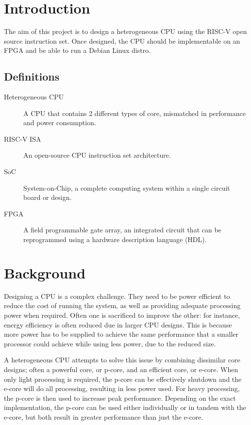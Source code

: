\documentclass[a4paper,fleqn,11pt]{article}
\begin{document}


\pagestyle{plain}

\section{Introduction}
The aim of this project is to design a heterogeneous CPU using the RISC-V open source instruction set. Once designed, the CPU should be implementable on an FPGA and be able to run a Debian Linux distro. 

\subsection{Definitions}
\begin{description}
    \item[Heterogeneous CPU] A CPU that contains 2 different types of core, mismatched in performance and power consumption.
    \item[RISC-V ISA] An open-source CPU instruction set architecture.
    \item[SoC] System-on-Chip, a complete computing system within a single circuit board or design. 
    \item[FPGA] A field programmable gate array, an integrated circuit that can be reprogrammed using a hardware description language (HDL).
\end{description}

\section{Background}
Designing a CPU is a complex challenge. They need to be power efficient to reduce the cost of running the system, as well as providing adequate processing power when required. Often one is sacrificed to improve the other: for instance, energy efficiency is often reduced due in larger CPU designs. This is because more power has to be supplied to achieve the same performance that a smaller processor could achieve while using less power, due to the reduced size.

A heterogeneous CPU attempts to solve this issue by combining dissimilar core designs; often a powerful core, or p-core, and an efficient core, or e-core. When only light processing is required, the p-core can be effectively shutdown and the e-core will do all processing, resulting in less power used. For heavy processing, the p-core is then used to increase peak performance. Depending on the exact implementation, the p-core can be used either individually or in tandem with the e-core, but both result in greater performance than just the e-core.
\end{document}
